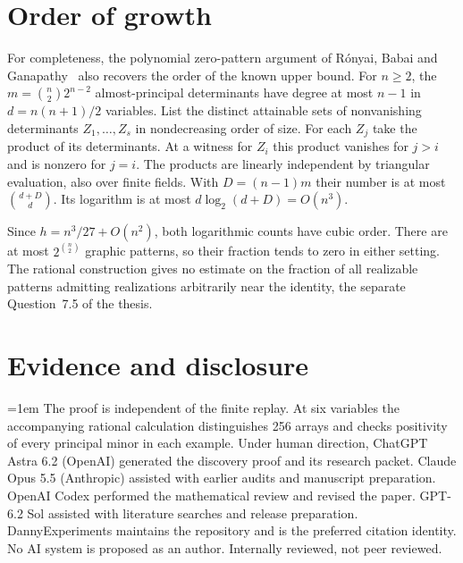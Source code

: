 \documentclass[11pt,a4paper]{amsart}
\begin{document}
\section{Order of growth}
For completeness, the polynomial zero-pattern argument of R\'onyai, Babai and Ganapathy~\cite{rbg} also recovers the order of the known upper bound. For $n\ge2$, the $m=\binom n2 2^{n-2}$ almost-principal determinants have degree at most $n-1$ in $d=n(n+1)/2$ variables. List the distinct attainable sets of nonvanishing determinants $Z_1,\ldots,Z_s$ in nondecreasing order of size. For each $Z_j$ take the product of its determinants. At a witness for $Z_i$ this product vanishes for $j>i$ and is nonzero for $j=i$. The products are linearly independent by triangular evaluation, also over finite fields. With $D=(n-1)m$ their number is at most $\binom{d+D}{d}$. Its logarithm is at most $d\log_2(d+D)=O(n^3)$.

Since $h=n^3/27+O(n^2)$, both logarithmic counts have cubic order. There are at most $2^{\binom n2}$ graphic patterns, so their fraction tends to zero in either setting. The rational construction gives no estimate on the fraction of all realizable patterns admitting realizations arbitrarily near the identity, the separate Question~7.5 of the thesis.

\section*{Evidence and disclosure}
\begingroup{}\emergencystretch=1em\relax
The proof is independent of the finite replay. At six variables the accompanying rational calculation distinguishes 256 arrays and checks positivity of every principal minor in each example. Under human direction, ChatGPT Astra 6.2 (OpenAI) generated the discovery proof and its research packet. Claude Opus 5.5 (Anthropic) assisted with earlier audits and manuscript preparation. OpenAI Codex performed the mathematical review and revised the paper. GPT-6.2 Sol assisted with literature searches and release preparation. DannyExperiments maintains the repository and is the preferred citation identity. No AI system is proposed as an author. Internally reviewed, not peer reviewed.
\par\endgroup


\end{document}
